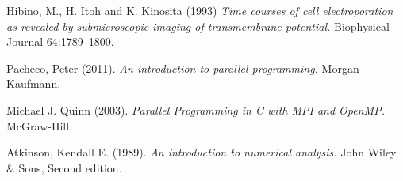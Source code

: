 \begin{thebibliography}{99}
    Hibino, M., H. Itoh and K. Kinosita (1993) \emph{Time courses of cell electroporation as revealed by submicroscopic imaging of transmembrane potential.} Biophysical Journal 64:1789–1800.

	Pacheco, Peter (2011). \emph{An introduction to parallel programming.} Morgan Kaufmann.

	Michael J. Quinn (2003). \emph{Parallel Programming in C with MPI and OpenMP.} McGraw-Hill.
	
	Atkinson, Kendall E. (1989). \emph{An introduction to numerical analysis.} John Wiley \& Sons, Second edition.

\end{thebibliography}
